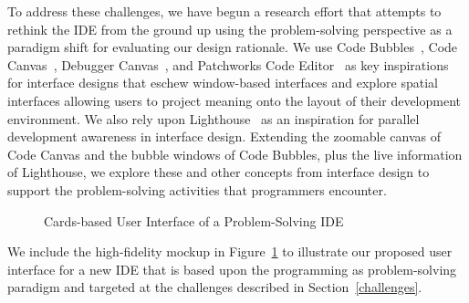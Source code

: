\documentclass{ppig}
\begin{document}
To address these challenges, we have begun a research effort that attempts to rethink the IDE from the ground up using the problem-solving perspective as a paradigm shift for evaluating our design rationale.
We use Code Bubbles~\cite{bragdon2010bubbles}, Code Canvas~\cite{deline2010canvas}, Debugger Canvas~\cite{deline2012debugger}, and Patchworks Code Editor~\cite{henley2014patchworks} as key inspirations for interface designs that eschew window-based interfaces and explore spatial interfaces allowing users to project meaning onto the layout of their development environment.
We also rely upon Lighthouse~\cite{dasilva2006lighthouse} as an inspiration for parallel development awareness in interface design.
Extending the zoomable canvas of Code Canvas and the bubble windows of Code Bubbles, plus the live information of Lighthouse, we explore these and other concepts from interface design to support the problem-solving activities that programmers encounter.

\begin{figure}[h!]
	\caption{Cards-based User Interface of a Problem-Solving IDE}
	\label{mockup}
	\vspace*{-1.5\baselineskip}
\end{figure}

We include the high-fidelity mockup in Figure~\ref{mockup} to illustrate our proposed user interface for a new IDE that is based upon the programming as problem-solving paradigm and targeted at the challenges described in Section~\ref{challenges}.
\end{document}
